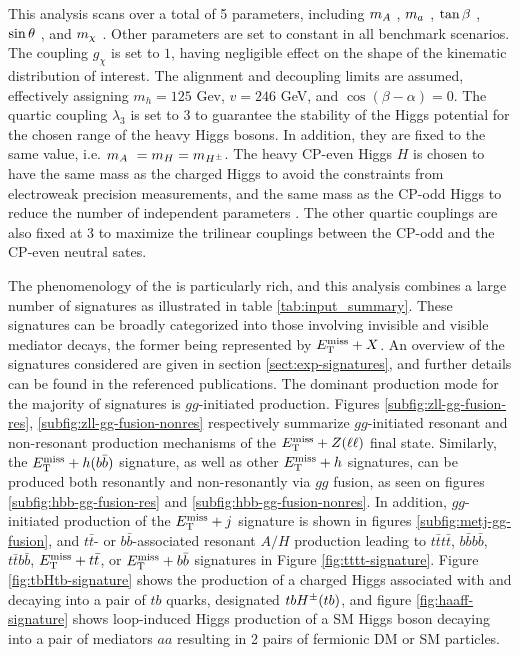 This analysis scans over a total of 5 parameters, including $m_A~$, $m_a~$, $\tan\beta~$, $\sin\theta~$, and $m_{\chi}~$. Other parameters are set to constant in all benchmark scenarios. The coupling $g_{\chi}$ is set to $1$, having negligible effect on the shape of the kinematic distribution of interest. The alignment and decoupling limits are assumed, effectively assigning $m_h=125$ Gev, $v=246$ GeV, and $\cos(\beta-\alpha)=0$. The quartic coupling $\lambda_3$ is set to 3 to guarantee the stability of the Higgs potential for the chosen range of the heavy Higgs bosons. In addition, they are fixed to the same value, i.e. $m_A~= m_H=m_{H^{\pm}}$. The heavy CP-even Higgs $H$ is chosen to have the same mass as the charged Higgs to avoid the constraints from electroweak precision measurements, and the same mass as the CP-odd Higgs to reduce the number of independent parameters \cite{Bauer:2017ota}. The other quartic couplings are also fixed at 3 to maximize the trilinear couplings between the CP-odd and the CP-even neutral sates. 

The phenomenology of the \thdma is particularly rich, and this analysis combines a large number of signatures as illustrated in table \ref{tab:input_summary}.
These signatures can be broadly categorized into those involving invisible and visible mediator decays, the former being represented by $E_{\mathrm{T}}^{\mathrm{miss}}+X$. An overview of the signatures considered are given in section \ref{sect:exp-signatures}, and further details can be found in the referenced publications. The dominant production mode for the majority of signatures is $gg$-initiated production. 
Figures \ref{subfig:zll-gg-fusion-res}, \ref{subfig:zll-gg-fusion-nonres} respectively summarize $gg$-initiated resonant and non-resonant production mechanisms of the $E_{\mathrm{T}}^{\mathrm{miss}}+Z(\ell\ell)$ final state. 
Similarly, the $E_{\mathrm{T}}^{\mathrm{miss}}+h(b\bar{b})$ signature, as well as other $E_{\mathrm{T}}^{\mathrm{miss}}+h$ signatures, can be produced both resonantly and non-resonantly via $gg$ fusion, as seen on figures \ref{subfig:hbb-gg-fusion-res} and \ref{subfig:hbb-gg-fusion-nonres}. 
In addition, $gg$-initiated production of the $E_{\mathrm{T}}^{\mathrm{miss}}+j$ signature is shown in figures \ref{subfig:metj-gg-fusion}, and $t\bar{t}$- or $b\bar{b}$-associated resonant $A/H$ production leading to $t\bar{t}t\bar{t}$, $b\bar{b}b\bar{b}$, $t\bar{t}b\bar{b}$, $E_{\mathrm{T}}^{\mathrm{miss}}+t\bar{t}$, or $E_{\mathrm{T}}^{\mathrm{miss}}+b\bar{b}$ signatures in Figure \ref{fig:tttt-signature}. 
Figure \ref{fig:tbHtb-signature} shows the production of a charged Higgs associated with and decaying into a pair of $tb$ quarks, designated $tbH^{\pm}(tb)$, and figure \ref{fig:haaff-signature} shows loop-induced Higgs production of a SM Higgs boson decaying into a pair of mediators $aa$ resulting in 2 pairs of fermionic DM or SM particles. 

